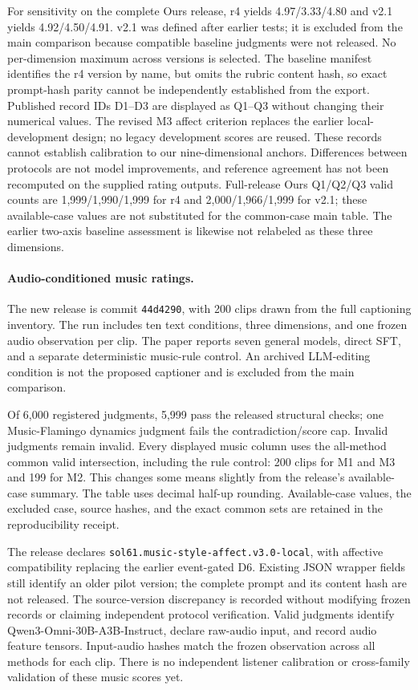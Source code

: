 For sensitivity on the complete Ours release, r4 yields 4.97/3.33/4.80
and v2.1 yields 4.92/4.50/4.91. v2.1 was defined after earlier tests;
it is excluded from the main comparison because compatible baseline
judgments were not released. No per-dimension maximum across versions
is selected. The baseline manifest identifies the r4 version by name,
but omits the rubric content hash, so exact prompt-hash parity cannot
be independently established from the export.
Published record IDs D1--D3 are displayed as Q1--Q3 without changing
their numerical values. The revised M3 affect criterion replaces the
earlier local-development design; no legacy development scores are reused.
These records cannot establish calibration to our nine-dimensional
anchors. Differences between protocols are not model improvements, and
reference agreement has not been recomputed on the supplied rating outputs.
Full-release Ours Q1/Q2/Q3 valid counts are 1,999/1,990/1,999 for r4
and 2,000/1,966/1,999 for v2.1; these available-case values are not
substituted for the common-case main table. The earlier two-axis
baseline assessment is likewise not relabeled as these three dimensions.

\paragraph{Audio-conditioned music ratings.}
The new release is commit \texttt{44d4290}, with 200 clips drawn from
the full captioning inventory. The run includes ten text conditions,
three dimensions, and one frozen audio observation per clip. The paper
reports seven general models, direct SFT, and a separate deterministic
music-rule control. An archived LLM-editing condition is not the proposed
captioner and is excluded from the main comparison.

Of 6,000 registered judgments, 5,999 pass the released structural checks;
one Music-Flamingo dynamics judgment fails the contradiction/score cap.
Invalid judgments remain invalid. Every displayed music column uses
the all-method common valid intersection, including the rule control:
200 clips for M1 and M3 and 199 for M2. This changes some means slightly
from the release's available-case summary. The table uses decimal
half-up rounding. Available-case values, the excluded case, source hashes,
and the exact common sets are retained in the reproducibility receipt.

The release declares \texttt{sol61.music-style-affect.v3.0-local}, with
affective compatibility replacing the earlier event-gated D6. Existing
JSON wrapper fields still identify an older pilot version; the complete
prompt and its content hash are not released. The source-version
discrepancy is recorded without modifying frozen records or claiming
independent protocol verification. Valid judgments identify
Qwen3-Omni-30B-A3B-Instruct, declare raw-audio input, and record audio
feature tensors. Input-audio hashes match the frozen observation across
all methods for each clip. There is no independent listener calibration
or cross-family validation of these music scores yet.

